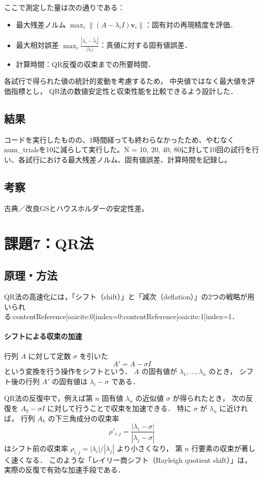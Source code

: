 \documentclass[a4paper,11pt]{ltjsarticle}
\begin{document}
ここで測定した量は次の通りである：
\begin{itemize}
  \item 最大残差ノルム $\displaystyle \max_i \| (A - \lambda_i I)\boldsymbol{v}_i \|$：固有対の再現精度を評価．
  \item 最大相対誤差 $\displaystyle \max_i \frac{|\lambda_i - \hat{\lambda}_i|}{|\lambda_i|}$：真値に対する固有値誤差．
  \item 計算時間：QR反復の収束までの所要時間．
\end{itemize}

各試行で得られた値の統計的変動を考慮するため，
中央値ではなく最大値を評価指標とし，
QR法の数値安定性と収束性能を比較できるよう設計した．


\subsection{結果}
コードを実行したものの、1時間経っても終わらなかったため、やむなくnum\_trialsを10に減らして実行した。N = 10, 20, 40, 80に対して10回の試行を行い、各試行における最大残差ノルム、固有値誤差、計算時間を記録し。
\subsection{考察}
古典／改良GSとハウスホルダーの安定性差。

\section{課題7：QR法}
\subsection{原理・方法}

QR法の高速化には，「シフト（shift）」と「減次（deflation）」の2つの戦略が用いられる:contentReference[oaicite:0]{index=0}:contentReference[oaicite:1]{index=1}．

\paragraph{シフトによる収束の加速}
行列 $A$ に対して定数 $\sigma$ を引いた
\[
A' = A - \sigma I
\]
という変換を行う操作をシフトという．
$A$ の固有値が $\lambda_1, \ldots, \lambda_n$ のとき，
シフト後の行列 $A'$ の固有値は $\lambda_i - \sigma$ である．

QR法の反復中で，例えば第 $n$ 固有値 $\lambda_n$ の近似値 $\sigma$ が得られたとき，
次の反復を $A_k - \sigma I$ に対して行うことで収束を加速できる．
特に $\sigma$ が $\lambda_n$ に近ければ，
行列 $A_k$ の下三角成分の収束率
\[
\rho'_{i,j} = \frac{|\lambda_i - \sigma|}{|\lambda_j - \sigma|}
\]
はシフト前の収束率 $\rho_{i,j} = |\lambda_i| / |\lambda_j|$ より小さくなり，
第 $n$ 行要素の収束が著しく速くなる．
このような「レイリー商シフト（Rayleigh quotient shift）」は，
実際の反復で有効な加速手段である．
\end{document}
